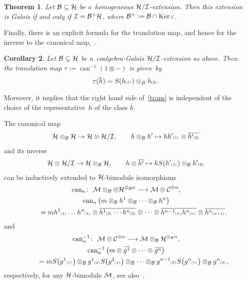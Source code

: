 \documentclass[pdftex]{sigma}
\numberwithin{equation}{section}
\newtheorem{Theorem}{Theorem}[section]
\newtheorem{Corollary}[Theorem]{Corollary}
\newcommand{\ps}[1]{~\hspace{-4pt}_{^{(#1)}}}
\newcommand{\wbar}[1]{\overline{#1}}
\begin{document}
\begin{Theorem}
Let ${\cal B}\subseteq {\cal H}$ be a~homogeneous ${\cal H}/{\cal I}$-extension.
Then this extension is Galois if and only if ${\cal I} ={\cal B}^{+}{\cal H}$, where ${\cal B}^{+}:={\cal B} \cap \operatorname{Ker}
\varepsilon$.
\end{Theorem}

Finally, there is an explicit formula for the translation map, and hence for the inverse to the canonical map,~\cite[Corollary~2.8]{BrzeHaja09}.

\begin{Corollary}
Let ${\cal B}\subseteq {\cal H}$ be a~coalgebra-Galois ${\cal H}/{\cal I}$-extension as above.
Then the translation map $\tau:=\operatorname{can}^{-1}(1 \otimes -)$ is given~by
\begin{gather}
\label{trans}
\tau(\overline{h}) =S(h\ps{1}) \otimes_{B} h\ps{2}.
\end{gather}
\end{Corollary}

Moreover, it implies that the right hand side of~\eqref{trans} is independent of the choice of the representative~$h$ of
the class $\overline{h}$.

The canonical map
\begin{gather*}%
{\cal H}\otimes_{{\cal B}}{\cal H}\rightarrow {\cal H}\otimes{\cal H}/{\cal I},
\qquad
h\otimes_{{\cal B}}h' \mapsto hh'\ps{1}\otimes \overline{h'\ps{2}}
\end{gather*}
and its inverse
\begin{gather*}%
{\cal H}\otimes{\cal H}/{\cal I} \rightarrow {\cal H}\otimes_{{\cal B}}{\cal H},
\qquad
h\otimes \overline{h'}\mapsto h S(h'\ps{1})\otimes_{{\cal B}} h'\ps{2}
\end{gather*}
can be inductively extended to ${\cal H}$-bimodule isomorphisms
\begin{gather*}%
\operatorname{can}_n\colon \ {\cal M}\otimes_{\cal B}\otimes{\cal H}^{\otimes_{\cal B} n} \longrightarrow {\cal M} \otimes {\cal C}^{\otimes n},
\\
\operatorname{can}_n\big(m \otimes_{\cal B} h^1\otimes_{\cal B} \cdots \otimes_{\cal B} h^n\big)
\\
\qquad{}
=mh^1\ps{1}\dots h^n\ps{1} \otimes \wbar{h^1\ps{2}\cdots h^n\ps{2}} \otimes\cdots\otimes \wbar{h^{n-1}\ps{n}h^n\ps{n}}
\otimes \wbar{h^n\ps{n+1}}.
\end{gather*}
and
\begin{gather*}%
\operatorname{can}^{-1}_n\colon \  {\cal M} \otimes {\cal C}^{\otimes n} \longrightarrow {\cal M}\otimes_{\cal B} {\cal H}^{\otimes_{\cal B} n},
\\
\operatorname{can}^{-1}_n\big(m \otimes \wbar{g^1} \otimes\cdots\otimes \wbar{g^n}\big)
\\
\qquad{}
=mS\big(g^1\ps{1}\big) \otimes_{\cal B} g^1\ps{2}S\big(g^2\ps{1}\big) \otimes_{\cal B} \cdots \otimes_{\cal B} g^{n-1}\ps{2}S\big(g^n\ps{1}\big)
\otimes_{\cal B} g^n\ps{2},
\end{gather*}
respectively, for any ${\cal H}$-bimodule ${\cal M}$, see also~\cite[Proposition~3.6]{Kadi14}.
\end{document}
